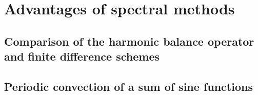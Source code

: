 \chapter{Advantages of spectral methods}
\label{cha:advantages}

\chabstract{}

\minitoc
\newpage


\section{Comparison of the harmonic balance operator and finite difference schemes}
\label{sec:hb_operator}


\section{Periodic convection of a sum of sine functions}
\label{sec:sum_sine}


\chconclu{}

